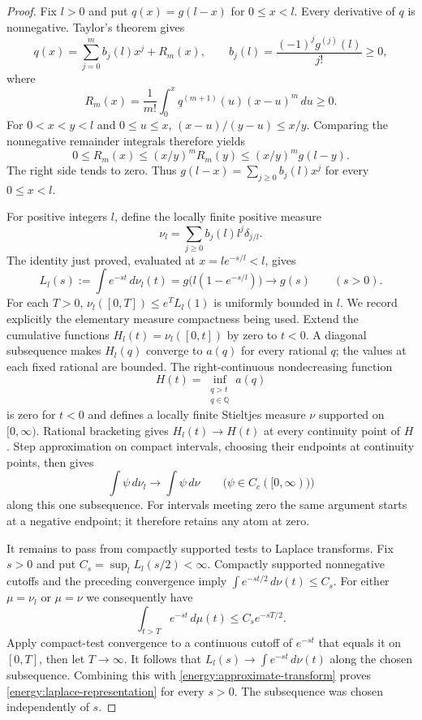 \documentclass[11pt]{article}
\theoremstyle{remark}\newtheorem{remark}[theorem]{Remark}
\begin{document}
\begin{proof}
Fix $l>0$ and put $q(x)=g(l-x)$ for $0\le x<l$.
Every derivative of $q$ is nonnegative. Taylor's theorem gives
\[
 q(x)=\sum_{j=0}^m b_j(l)x^j+R_m(x),\qquad
 b_j(l)=\frac{(-1)^j g^{(j)}(l)}{j!}\ge0,
\]
where
\[
 R_m(x)=\frac1{m!}\int_0^x q^{(m+1)}(u)(x-u)^m\,du\ge0.
\]
For $0<x<y<l$ and $0\le u\le x$,
$(x-u)/(y-u)\le x/y$. Comparing the nonnegative remainder integrals
therefore yields
\[
 0\le R_m(x)\le(x/y)^mR_m(y)\le(x/y)^m g(l-y).
\]
The right side tends to zero. Thus
$g(l-x)=\sum_{j\ge0}b_j(l)x^j$ for every $0\le x<l$.

For positive integers $l$, define the locally finite positive measure
\[
 \nu_l=\sum_{j\ge0}b_j(l)l^j\delta_{j/l}.
\]
The identity just proved, evaluated at $x=le^{-s/l}<l$, gives
\begin{equation}
 L_l(s):=\int e^{-st}\,d\nu_l(t)
 =g\bigl(l(1-e^{-s/l})\bigr)\longrightarrow g(s)
 \qquad(s>0).
 \label{energy:approximate-transform}
\end{equation}
For each $T>0$,
$\nu_l([0,T])\le e^T L_l(1)$ is uniformly bounded in $l$.
We record explicitly the elementary measure compactness being used.
Extend the cumulative functions $H_l(t)=\nu_l([0,t])$ by zero to
$t<0$. A diagonal subsequence makes $H_l(q)$ converge to $a(q)$
for every rational $q$; the values at each fixed rational are bounded.
The right-continuous nondecreasing function
\[
 H(t)=\inf_{\substack{q>t\\q\in\mathbb Q}}a(q)
\]
is zero for $t<0$ and defines a locally finite Stieltjes measure $\nu$
supported on $[0,\infty)$. Rational bracketing gives
$H_l(t)\to H(t)$ at every continuity point of $H$.
Step approximation on compact intervals, choosing their endpoints
at continuity points, then gives
\[
 \int\psi\,d\nu_l\longrightarrow\int\psi\,d\nu
 \qquad\bigl(\psi\in C_c([0,\infty))\bigr)
\]
along this one subsequence. For intervals meeting zero the same
argument starts at a negative endpoint; it therefore retains any
atom at zero.

It remains to pass from compactly supported tests to Laplace transforms.
Fix $s>0$ and put $C_s=\sup_l L_l(s/2)<\infty$.
Compactly supported nonnegative cutoffs and the preceding convergence
imply $\int e^{-st/2}\,d\nu(t)\le C_s$.
For either $\mu=\nu_l$ or $\mu=\nu$ we consequently have
\[
 \int_{t>T}e^{-st}\,d\mu(t)\le C_s e^{-sT/2}.
\]
Apply compact-test convergence to a continuous cutoff of $e^{-st}$
that equals it on $[0,T]$, then let $T\to\infty$.
It follows that $L_l(s)\to\int e^{-st}\,d\nu(t)$ along the chosen
subsequence. Combining this with \eqref{energy:approximate-transform}
proves \eqref{energy:laplace-representation} for every $s>0$.
The subsequence was chosen independently of $s$.
\end{proof}
\end{document}
